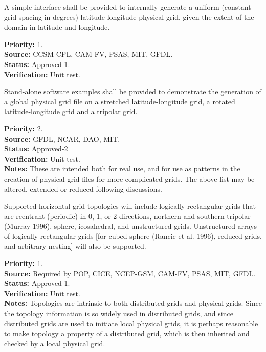A simple interface shall be provided to internally generate a uniform (constant
grid-spacing in degrees) latitude-longitude physical grid, given the extent of the domain
in latitude and longitude.                                                           
\begin{reqlist}
{\bf Priority:} 1. \\
{\bf Source:} CCSM-CPL, CAM-FV, PSAS, MIT, GFDL. \\
{\bf Status:} Approved-1. \\
{\bf Verification:} Unit test.
\end{reqlist}

Stand-alone software examples shall be provided to demonstrate the generation of a
global physical grid file on a stretched latitude-longitude grid, a rotated
latitude-longitude grid and a tripolar grid. 
\begin{reqlist}
{\bf Priority:} 2. \\
{\bf Source:} GFDL, NCAR, 
DAO, MIT. \\
{\bf Status:} Approved-2 \\
{\bf Verification:} Unit test.\\
{\bf Notes:} These are intended both for real use, and for use as patterns in the
creation of physical grid files for more complicated grids.  The above list may be
altered, extended or reduced following discussions.
\end{reqlist}

 Supported horizontal grid topologies will include
logically rectangular grids that are reentrant (periodic) in 0, 1, or 2 directions,
northern and southern tripolar (Murray 1996), sphere, icosahedral, and unstructured
grids.  Unstructured arrays of logically rectangular grids [for cubed-sphere (Rancic
et al. 1996), reduced grids, and arbitrary nesting] will also be supported.
\begin{reqlist}
{\bf Priority:} 1. \\
{\bf Source:} Required by POP, CICE, NCEP-GSM,
CAM-FV, PSAS, MIT, GFDL.  \\
{\bf Status:} Approved-1. \\
{\bf Verification:} Unit test.\\
{\bf Notes:}  Topologies are intrinsic to both distributed grids and physical grids.  Since
the topology information is so widely used in distributed grids, and since distributed grids
are used to initiate local physical grids, it is perhaps reasonable to make topology a
property of a distributed grid, which is then inherited and checked by a local physical grid.
\end{reqlist}

